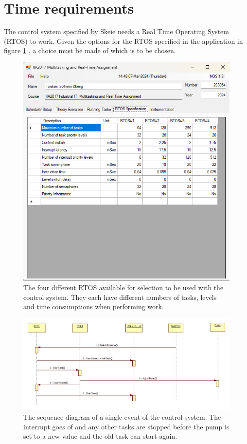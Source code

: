\documentclass[12pt, A4paper, english]{book}
\begin{document}
		\section{Time requirements}
The control system specified by Skeie \cite{task} needs a Real Time Operating System (RTOS) to work. Given the options for the RTOS specified in the application in figure \ref{im:ROTSparams} \cite{app}, a choice must be made of which is to be chosen.
			\begin{figure}
\includegraphics[width=\linewidth]{Parameters_3}
\caption{The four different RTOS available for selection to be used with the control system. They each have different numbers of tasks, levels and time consumptions when performing work.}
\label{im:ROTSparams}
			\end{figure}
			\begin{figure}
\includegraphics[width=\linewidth]{Timing Diagram.jpg}
\caption{The sequence diagram of a single event of the control system. The interrupt goes of and any other tasks are stopped before the pump is set to a new value and the old task can start again.}
\label{im:TimingDiag}
			\end{figure}
\end{document}

